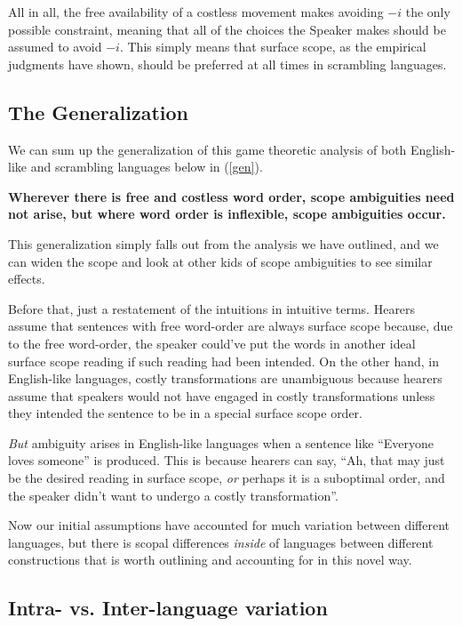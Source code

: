\documentclass{article}
\begin{document}
All in all, the free availability of a costless movement makes avoiding $-i$ the only possible constraint, meaning that all of the choices the Speaker makes should be assumed to avoid $-i$.
This simply means that surface scope, as the empirical judgments have shown, should be preferred at all times in scrambling languages.

\subsection{The Generalization}

We can sum up the generalization of this game theoretic analysis of both English-like and scrambling languages below in (\ref{gen}).

\begin{exe}
\ex \textbf{Wherever there is free and costless word order, scope ambiguities need not arise, but where word order is inflexible, scope ambiguities occur.
\label{gen}}
\end{exe}

This generalization simply falls out from the analysis we have outlined, and we can widen the scope and look at other kids of scope ambiguities to see similar effects.

Before that, just a restatement of the intuitions in intuitive terms.
Hearers assume that sentences with free word-order are always surface scope because, due to the free word-order, the speaker could've put the words in another ideal surface scope reading if such reading had been intended.
On the other hand, in English-like languages, costly transformations are unambiguous because hearers assume that speakers would not have engaged in costly transformations unless they intended the sentence to be in a special surface scope order.

\emph{But} ambiguity arises in English-like languages when a sentence like ``Everyone loves someone'' is produced.
This is because hearers can say, ``Ah, that may just be the desired reading in surface scope, \emph{or} perhaps it is a suboptimal order, and the speaker didn't want to undergo a costly transformation''.

Now our initial assumptions have accounted for much variation between different languages, but there is scopal differences \emph{inside} of languages between different constructions that is worth outlining and accounting for in this novel way.

\subsection{Intra- vs. Inter-language variation}
\end{document}
